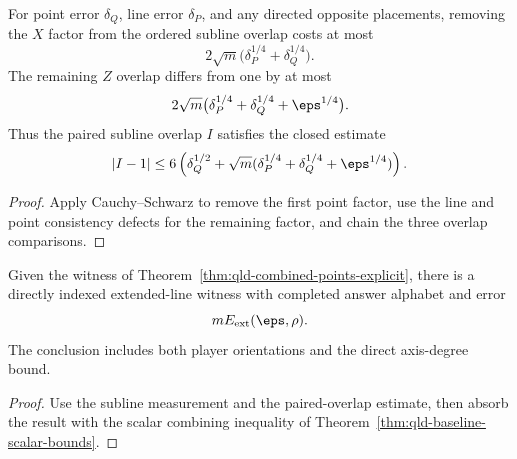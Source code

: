 \begin{theorem}
\label{thm:qld-subline-overlaps-explicit}
\leanok
{}
For point error $\delta_Q$, line error $\delta_P$, and any directed opposite
placements, removing the $X$ factor from the ordered subline overlap costs at
most
\[
  2\sqrt m\bigl(\delta_P^{1/4}+\delta_Q^{1/4}\bigr).
\]
The remaining $Z$ overlap differs from one by at most
\[
  2\sqrt m\bigl(\delta_P^{1/4}+\delta_Q^{1/4}+\eps^{1/4}\bigr).
\]
Thus the paired subline overlap $I$ satisfies the closed estimate
\[
 |I-1|\leq6\left(\delta_Q^{1/2}+\sqrt m
   (\delta_P^{1/4}+\delta_Q^{1/4}+\eps^{1/4})\right).
\]
\end{theorem}
\begin{proof}
\leanok
Apply Cauchy--Schwarz to remove the first point factor, use the line and point
consistency defects for the remaining factor, and chain the three overlap
comparisons.
\end{proof}

\begin{theorem}
\label{thm:qld-extended-lines-explicit}
\leanok
{}
Given the witness of Theorem~\ref{thm:qld-combined-points-explicit}, there is a
directly indexed extended-line witness with completed answer alphabet and
error
\[
  mE_{\mathrm{ext}}(\eps,\rho).
\]
The conclusion includes both player orientations and the direct axis-degree
bound.
\end{theorem}
\begin{proof}
\leanok
{}
Use the subline measurement and the paired-overlap estimate, then absorb the
result with the scalar combining inequality of
Theorem~\ref{thm:qld-baseline-scalar-bounds}.
\end{proof}

